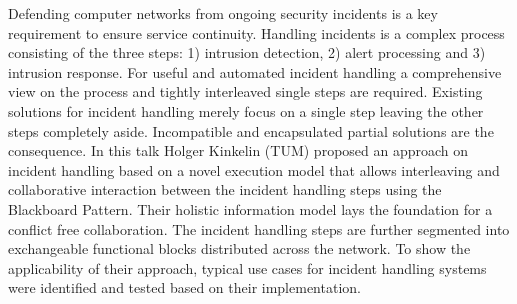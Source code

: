Defending computer networks from ongoing security incidents is a key
requirement to ensure service continuity. Handling incidents is a complex
process consisting of the three steps: 1) intrusion detection, 2) alert
processing and 3) intrusion response. For useful and automated incident
handling a comprehensive view on the process and tightly interleaved single
steps are required. Existing solutions for incident handling merely focus on a
single step leaving the other steps completely aside. Incompatible and
encapsulated partial solutions are the consequence. In this talk Holger
Kinkelin (TUM) proposed an approach \cite{herold:iscs:2016} on incident
handling based on a novel execution model that allows interleaving and
collaborative interaction between the incident handling steps using the
Blackboard Pattern. Their holistic information model lays the foundation for a
conflict free collaboration. The incident handling steps are further segmented
into exchangeable functional blocks distributed across the network. To show
the applicability of their approach, typical use cases for incident handling
systems were identified and tested based on their implementation.
